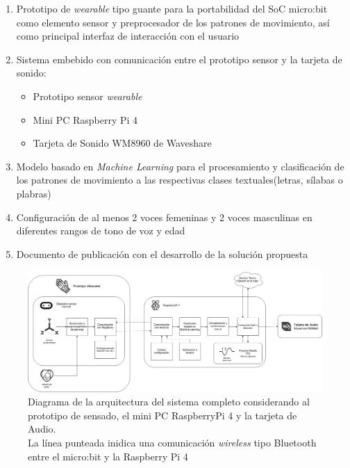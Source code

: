 \begin{enumerate}
	\item Prototipo de \textit{wearable} tipo guante para la portabilidad del SoC micro:bit como elemento sensor y preprocesador de los patrones de movimiento, así como principal interfaz de interacción con el usuario
	
	\item Sistema embebido con comunicación entre el prototipo sensor y la tarjeta de sonido:
	\begin{itemize}
		\item Prototipo sensor \textit{wearable}
		\item Mini PC Raspberry Pi 4
		\item Tarjeta de Sonido WM8960 de Waveshare
	\end{itemize}
	
	\item Modelo basado en \textit{Machine Learning} para el procesamiento y clasificación de los patrones de movimiento a las respectivas clases textuales(letras, sílabas o plabras)
	
	\item Configuración de al menos 2 voces femeninas y 2 voces masculinas en diferentes rangos de tono de voz y edad
	
	\item Documento de publicación con el desarrollo de la solución propuesta
\end{enumerate}

\begin{figure}[!h]
	\centering
	\includegraphics[width=19cm]{Imagenes/Diagrama_Arquitectura.png}
	\caption{Diagrama de la arquitectura del sistema completo considerando al prototipo de sensado, el mini PC RaspberryPi 4 y la tarjeta de Audio.\\ La línea punteada inidica una comunicación \textit{wireless} tipo Bluetooth entre el micro:bit y la Raspberry Pi 4}
	\label{Arquitectura}
\end{figure}